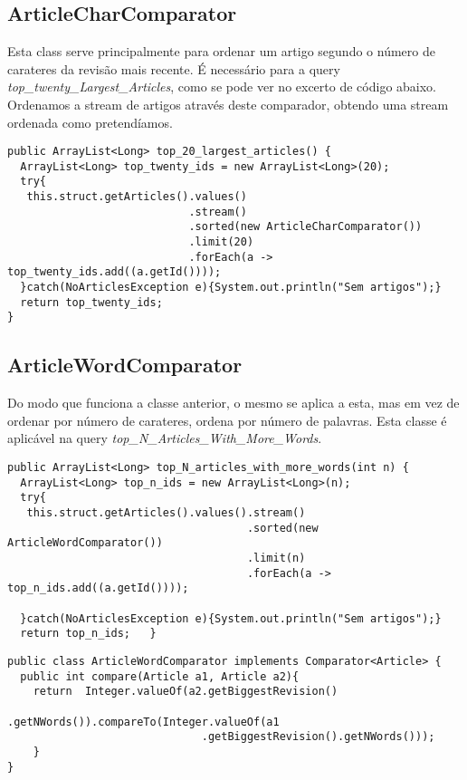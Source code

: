 \documentclass{article}
\begin{document}
\clearpage

\subsection{ArticleCharComparator}
\par Esta class serve principalmente para ordenar um artigo segundo o número de carateres da revisão mais recente. É necessário para a query \emph{top\_twenty\_Largest\_Articles}, como se pode ver no excerto de código abaixo. Ordenamos a stream de artigos através deste comparador, obtendo uma stream ordenada como pretendíamos.

\begin{lstlisting}
public ArrayList<Long> top_20_largest_articles() {
  ArrayList<Long> top_twenty_ids = new ArrayList<Long>(20);
  try{
   this.struct.getArticles().values()
   							.stream()
                            .sorted(new ArticleCharComparator())
                            .limit(20)
                            .forEach(a -> top_twenty_ids.add((a.getId())));
  }catch(NoArticlesException e){System.out.println("Sem artigos");}
  return top_twenty_ids;
}
\end{lstlisting}

\subsection{ArticleWordComparator}
\par Do modo que funciona a classe anterior, o mesmo se aplica a esta, mas em vez de ordenar por número de carateres, ordena por número de palavras. Esta classe é aplicável na query \emph{top\_N\_Articles\_With\_More\_Words}.

\begin{lstlisting}
public ArrayList<Long> top_N_articles_with_more_words(int n) {
  ArrayList<Long> top_n_ids = new ArrayList<Long>(n);
  try{
   this.struct.getArticles().values().stream()
                                     .sorted(new ArticleWordComparator())
                                     .limit(n)
                                     .forEach(a -> top_n_ids.add((a.getId())));

  }catch(NoArticlesException e){System.out.println("Sem artigos");}
  return top_n_ids;   }
\end{lstlisting}
\begin{lstlisting}
public class ArticleWordComparator implements Comparator<Article> {
  public int compare(Article a1, Article a2){
    return  Integer.valueOf(a2.getBiggestRevision()
  							  .getNWords()).compareTo(Integer.valueOf(a1
    						  .getBiggestRevision().getNWords()));
    }
}
\end{lstlisting}
\end{document}
